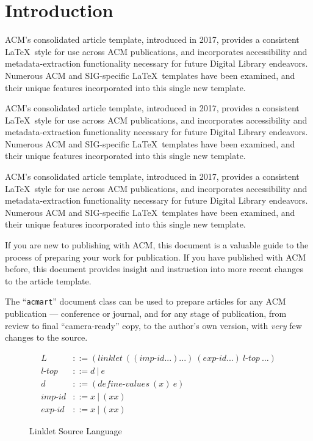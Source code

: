 \documentclass[sigplan,screen,anonymous]{acmart}
\def\dash {\text{-}}
\begin{document}
%
\maketitle

\section{Introduction}
ACM's consolidated article template, introduced in 2017, provides a consistent \LaTeX\ style for use across ACM publications, and incorporates accessibility and metadata-extraction functionality necessary for future Digital Library endeavors. Numerous ACM and SIG-specific \LaTeX\ templates have been examined, and their unique features incorporated into this single new template.

ACM's consolidated article template, introduced in 2017, provides a consistent \LaTeX\ style for use across ACM publications, and incorporates accessibility and metadata-extraction functionality necessary for future Digital Library endeavors. Numerous ACM and SIG-specific \LaTeX\ templates have been examined, and their unique features incorporated into this single new template.

ACM's consolidated article template, introduced in 2017, provides a consistent \LaTeX\ style for use across ACM publications, and incorporates accessibility and metadata-extraction functionality necessary for future Digital Library endeavors. Numerous ACM and SIG-specific \LaTeX\ templates have been examined, and their unique features incorporated into this single new template.


If you are new to publishing with ACM, this document is a valuable guide to the process of preparing your work for publication. If you have published with ACM before, this document provides insight and instruction into more recent changes to the article template.

The ``\verb|acmart|'' document class can be used to prepare articles for any ACM publication --- conference or journal, and for any stage of publication, from review to final ``camera-ready'' copy, to the author's own version, with {\it very} few changes to the source.

\begin{figure}[tbp]
\begin{align*}
L  &::= (linklet\:((imp\dash id ...) ...)\:(exp\dash id ...)\:l\dash top\:\ldots)\\
l\dash top &::= d\:|\:e \\
d &::= (define\dash values\:(x)\:e) \\
imp\dash id &::= x\:|\:(x x) \tag{external internal}\\
exp\dash id &::= x\:|\:(x x) \tag{internal external}
\end{align*}
\caption{Linklet Source Language}
\label{fig:linklet-source}
\end{figure}
\end{document}

